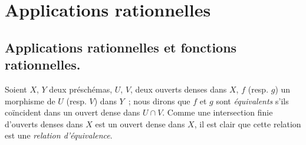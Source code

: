 \section{Applications rationnelles}
\label{section:I.7-fr}

\subsection{Applications rationnelles et fonctions rationnelles.}
\label{subsection:I.7.1-fr}

\begin{env}[7.1.1]
\label{I.7.1.1-fr}
Soient $X$, $Y$ deux préschémas, $U$, $V$, deux ouverts denses dans $X$, $f$
(resp. $g$) un morphisme de $U$ (resp. $V$) dans $Y$~; nous dirons que $f$ et
$g$ sont
\emph{équivalents} s'ils coïncident dans un ouvert dense dans $U\cap V$.
Comme une intersection finie d'ouverts denses dans $X$ est un ouvert dense
dans $X$, il est clair que cette relation est une
\emph{relation d'équivalence}.
\end{env}

